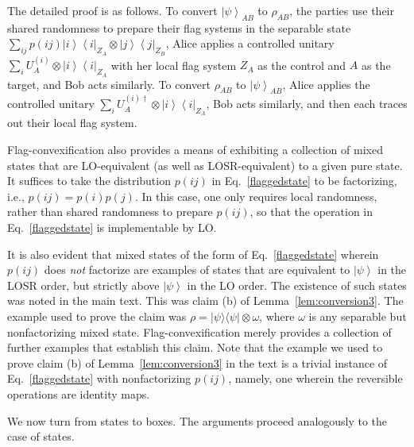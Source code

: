 \documentclass[prx,11pt,letterpaper,twocolumn,accepted=2023-11-27]{quantumarticle}
\newcommand{\ket}[1]{\left| #1 \right>}
\newcommand{\bra}[1]{\left< #1 \right|}
\theoremstyle{plain}
\theoremstyle{definition}
\begin{document}
\begin{appendices}
The detailed proof 
 is as follows. 
  To convert $\ket{\psi}_{AB}$ to $\rho_{AB}$, the parties use their shared randomness to prepare their flag systems in the separable state $\sum_{ij} p(ij) \ket{i}\bra{i}_{Z_A} \otimes \ket{j}\bra{j}_{Z_B}$, Alice applies a controlled unitary $\sum_i U_A^{(i)} \otimes \ket{i}\bra{i}_{Z_A}$ with her local flag system $Z_A$ as the control and $A$ 
  as the target, and Bob acts similarly.
To convert $\rho_{AB}$ to $\ket{\psi}_{AB}$, Alice applies the controlled unitary $\sum_i U_A^{(i)\dagger} \otimes \ket{i}\bra{i}_{Z_A}$, 
 Bob acts similarly, and then each traces out their local flag system.

Flag-convexification also provides a means of exhibiting a collection of mixed states that are LO-equivalent (as well as LOSR-equivalent) to a given pure state.  It suffices to take the distribution $p(ij)$ in Eq.~\eqref{flaggedstate} to be factorizing, i.e., $p(ij)= p(i)p(j)$.  In this case, one only requires local randomness, rather than shared randomness to prepare $p(ij)$, so that the operation in Eq.~\eqref{flaggedstate} is implementable by LO.

It is also evident that mixed states of the form of Eq.~\eqref{flaggedstate} wherein $p(ij)$ does {\em not} factorize are examples of states that are equivalent to $\ket{\psi}$ in the LOSR order, but strictly above $\ket{\psi}$ in the LO order.   The existence of such states was noted in the main text.  This was claim (b) of Lemma~\eqref{lem:conversion3}.  The example used to prove the claim was $\rho = |\psi\rangle\langle \psi| \otimes \omega$, where $\omega$ is any separable but nonfactorizing mixed state.  Flag-convexification merely provides a collection of further examples that establish this claim.   Note that the example we used to prove claim (b) of Lemma~\ref{lem:conversion3} in the text is a trivial instance of Eq.~\eqref{flaggedstate} with nonfactorizing $p(ij)$, namely, one wherein the reversible operations are identity maps. 


We now turn from states to boxes.  The arguments proceed analogously to the case of states.


\end{appendices}
\end{document}
